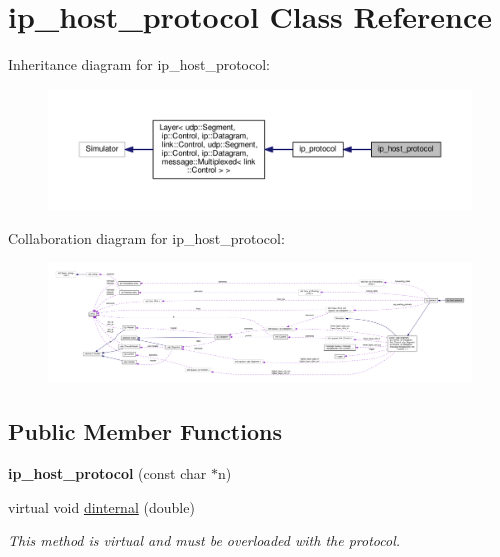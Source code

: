 \hypertarget{classip__host__protocol}{}\section{ip\+\_\+host\+\_\+protocol Class Reference}
\label{classip__host__protocol}


Inheritance diagram for ip\+\_\+host\+\_\+protocol\+:\nopagebreak
\begin{figure}[H]
\begin{center}
\leavevmode
\includegraphics[width=350pt]{classip__host__protocol__inherit__graph}
\end{center}
\end{figure}


Collaboration diagram for ip\+\_\+host\+\_\+protocol\+:
\nopagebreak
\begin{figure}[H]
\begin{center}
\leavevmode
\includegraphics[width=350pt]{classip__host__protocol__coll__graph}
\end{center}
\end{figure}
\subsection*{Public Member Functions}
\begin{DoxyCompactItemize}
\item 
{\bfseries ip\+\_\+host\+\_\+protocol} (const char $\ast$n)\hypertarget{classip__host__protocol_a29412893a5845c69af6031eb6734e8c0}{}\label{classip__host__protocol_a29412893a5845c69af6031eb6734e8c0}

\item 
virtual void \hyperlink{classip__host__protocol_a2e2c43aeb81ae38702b7dec6f7df9227}{dinternal} (double)
\begin{DoxyCompactList}\small\item\em This method is virtual and must be overloaded with the protocol. \end{DoxyCompactList}\end{DoxyCompactItemize}
